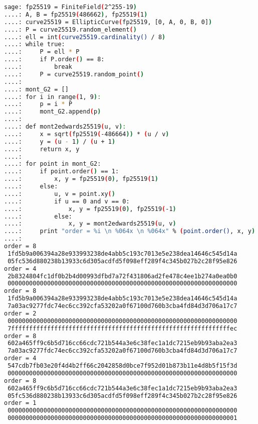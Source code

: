 \documentclass{article}
\begin{document}
\begin{lstlisting}[language=bash, caption=Edwards25519的低阶点, label=lst-edwards25519lowpoint]
sage: fp25519 = FiniteField(2^255-19)
....: A, B = fp25519(486662), fp25519(1)
....: curve25519 = EllipticCurve(fp25519, [0, A, 0, B, 0])
....: P = curve25519.random_element()
....: ell = int(curve25519.cardinality() / 8)
....: while true:
....:     P = ell * P
....:     if P.order() == 8:
....:         break
....:     P = curve25519.random_point()
....:
....: mont_G2 = []
....: for i in range(1, 9):
....:     p = i * P
....:     mont_G2.append(p)
....:
....: def mont2edwards25519(u, v):
....:     x = sqrt(fp25519(-486664)) * (u / v)
....:     y = (u - 1) / (u + 1)
....:     return x, y
....:
....: for point in mont_G2:
....:     if point.order() == 1:
....:         x, y = fp25519(0), fp25519(1)
....:     else:
....:         u, v = point.xy()
....:         if u == 0 and v == 0:
....:             x, y = fp25519(0), fp25519(-1)
....:         else:
....:             x, y = mont2edwards25519(u, v)
....:     print "order = %i \n %064x \n %064x" % (point.order(), x, y)
....:
order = 8
 1fd5b9a006394a28e933993238de4abb5c193c7013e5e238dea14646c545d14a
 05fc536d880238b13933c6d305acdfd5f098eff289f4c345b027b2c28f95e826
order = 4
 2b8324804fc1df0b2b4d00993dfbd7a72f431806ad2fe478c4ee1b274a0ea0b0
 0000000000000000000000000000000000000000000000000000000000000000
order = 8
 1fd5b9a006394a28e933993238de4abb5c193c7013e5e238dea14646c545d14a
 7a03ac9277fdc74ec6cc392cfa53202a0f67100d760b3cba4fd84d3d706a17c7
order = 2
 0000000000000000000000000000000000000000000000000000000000000000
 7fffffffffffffffffffffffffffffffffffffffffffffffffffffffffffffec
order = 8
 602a465ff9c6b5d716cc66cdc721b544a3e6c38fec1a1dc7215eb9b93aba2ea3
 7a03ac9277fdc74ec6cc392cfa53202a0f67100d760b3cba4fd84d3d706a17c7
order = 4
 547cdb7fb03e20f4d4b2ff66c2042858d0bce7f952d01b873b11e4d8b5f15f3d
 0000000000000000000000000000000000000000000000000000000000000000
order = 8
 602a465ff9c6b5d716cc66cdc721b544a3e6c38fec1a1dc7215eb9b93aba2ea3
 05fc536d880238b13933c6d305acdfd5f098eff289f4c345b027b2c28f95e826
order = 1
 0000000000000000000000000000000000000000000000000000000000000000
 0000000000000000000000000000000000000000000000000000000000000001
\end{lstlisting}
\end{document}
